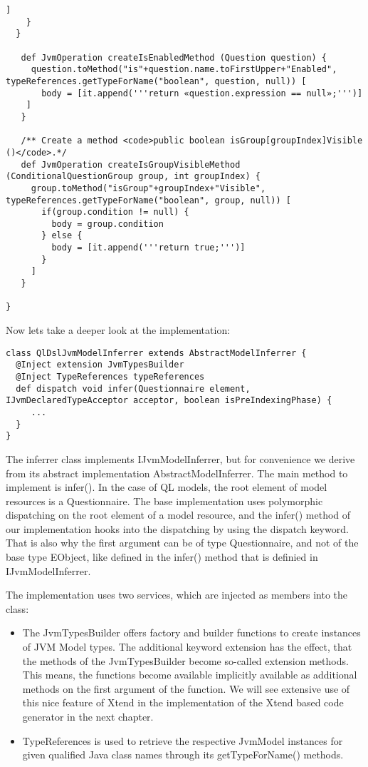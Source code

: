 \begin{lstlisting}[language=Xtend]
      ]
    }
  }

   def JvmOperation createIsEnabledMethod (Question question) {
     question.toMethod("is"+question.name.toFirstUpper+"Enabled", typeReferences.getTypeForName("boolean", question, null)) [
       body = [it.append('''return «question.expression == null»;''')]
    ]
   }

   /** Create a method <code>public boolean isGroup[groupIndex]Visible ()</code>.*/
   def JvmOperation createIsGroupVisibleMethod (ConditionalQuestionGroup group, int groupIndex) {
     group.toMethod("isGroup"+groupIndex+"Visible", typeReferences.getTypeForName("boolean", group, null)) [
       if(group.condition != null) {
         body = group.condition
       } else {
         body = [it.append('''return true;''')]
       }
     ]
   }

}
\end{lstlisting}

Now lets take a deeper look at the implementation:

\begin{lstlisting}[language=Xtend]
class QlDslJvmModelInferrer extends AbstractModelInferrer {
  @Inject extension JvmTypesBuilder
  @Inject TypeReferences typeReferences
  def dispatch void infer(Questionnaire element, IJvmDeclaredTypeAcceptor acceptor, boolean isPreIndexingPhase) {
     ...
  }
}
\end{lstlisting}

The inferrer class implements IJvmModelInferrer, but for convenience we derive
from its abstract implementation AbstractModelInferrer. The main method to
implement is infer(). In the case of QL models, the root element
of model resources is a Questionnaire. The base implementation uses polymorphic dispatching on
the root element of a model resource, and the infer() method of our
implementation hooks into the dispatching by using the dispatch keyword. That is
also why the first argument can be of type Questionnaire, and not of the base
type EObject, like defined in the infer() method that is definied in
IJvmModelInferrer.

The implementation uses two services, which are injected as members into the
class:
\begin{itemize}
\item The JvmTypesBuilder offers factory and builder functions to create
instances of JVM Model types. The additional keyword extension has the effect,
that the methods of the JvmTypesBuilder become so-called extension methods.
This means, the functions become available implicitly available as additional
methods on the first argument of the function. We will see extensive use of this
nice feature of Xtend in the implementation of the Xtend based code generator in
the next chapter.
\item TypeReferences is used to retrieve the respective JvmModel instances for
given qualified Java class names through its getTypeForName() methods. 
\end{itemize}

